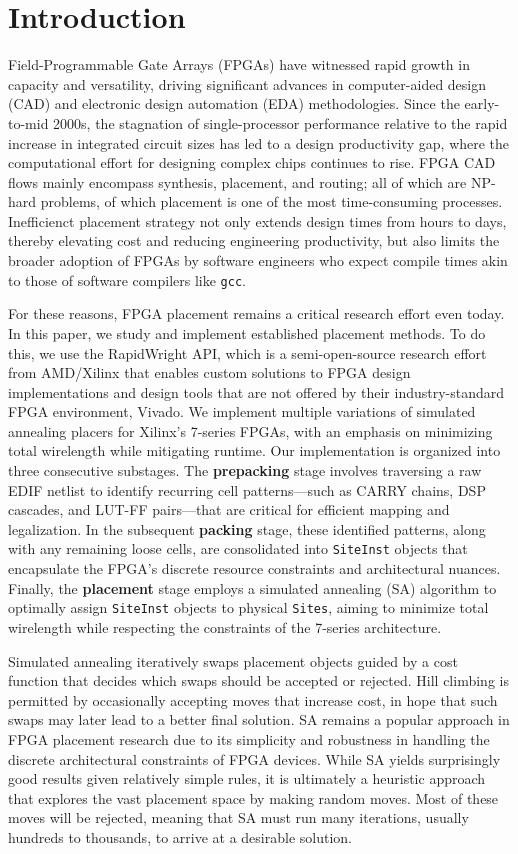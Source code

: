 \section{Introduction}

Field-Programmable Gate Arrays (FPGAs) have witnessed rapid growth in capacity and versatility, driving significant advances in computer-aided design (CAD) and electronic design automation (EDA) methodologies. 
Since the early-to-mid 2000s, the stagnation of single-processor performance relative to the rapid increase in integrated circuit sizes has led to a design productivity gap, where the computational effort for designing complex chips continues to rise. 
FPGA CAD flows mainly encompass synthesis, placement, and routing; all of which are NP-hard problems, of which placement is one of the most time-consuming processes. 
Inefficienct placement strategy not only extends design times from hours to days, thereby elevating cost and reducing engineering productivity, but also limits the broader adoption of FPGAs by software engineers who expect compile times akin to those of software compilers like {\tt gcc}. 

For these reasons, FPGA placement remains a critical research effort even today. 
In this paper, we study and implement established placement methods. 
To do this, we use the RapidWright API, which is a semi-open-source research effort from AMD/Xilinx that enables custom solutions to FPGA design implementations and design tools that are not offered by their industry-standard FPGA environment, Vivado. 
We implement multiple variations of simulated annealing placers for Xilinx's 7-series FPGAs, with an emphasis on minimizing total wirelength while mitigating runtime. 
Our implementation is organized into three consecutive substages. 
The \textbf{prepacking} stage involves traversing a raw EDIF netlist to identify recurring cell patterns—such as CARRY chains, DSP cascades, and LUT-FF pairs—that are critical for efficient mapping and legalization. 
In the subsequent \textbf{packing} stage, these identified patterns, along with any remaining loose cells, are consolidated into \texttt{SiteInst} objects that encapsulate the FPGA’s discrete resource constraints and architectural nuances. 
Finally, the \textbf{placement} stage employs a simulated annealing (SA) algorithm to optimally assign \texttt{SiteInst} objects to physical \texttt{Sites}, aiming to minimize total wirelength while respecting the constraints of the 7-series architecture. 

Simulated annealing iteratively swaps placement objects guided by a cost function that decides which swaps should be accepted or rejected. 
Hill climbing is permitted by occasionally accepting moves that increase cost, in hope that such swaps may later lead to a better final solution. 
SA remains a popular approach in FPGA placement research due to its simplicity and robustness in handling the discrete architectural constraints of FPGA devices. 
While SA yields surprisingly good results given relatively simple rules, it is ultimately a heuristic approach that explores the vast placement space by making random moves. 
Most of these moves will be rejected, meaning that SA must run many iterations, usually hundreds to thousands, to arrive at a desirable solution. 

